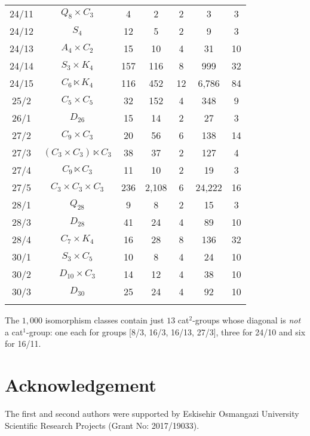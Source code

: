 \documentclass{ws-ijac}
\begin{document}
\begin{table}[h!]
{\begin{tabular}{@{}ccccccc@{}}
	24/11 & $Q_8 \times C_3$ & 4 & 2 & 2 & 3 & 3 \\ 
	24/12 & $S_4$ & 12 & 5 & 2 & 9 & 3 \\ 
	24/13 & $A_4 \times C_2$ & 15 & 10 & 4 & 31 & 10 \\ 
	24/14 & $S_3 \times K_4$ & 157 & 116 & 8 & 999 & 32 \\ 
	24/15 & $C_6 \ltimes K_4$ & 116 & 452 & 12 & 6,786 & 84 \\ 
	25/2 & $C_5 \times C_5$ & 32 & 152 & 4 & 348 & 9 \\ 
	26/1 & $D_{26}$ & 15 & 14 & 2 & 27 & 3 \\ 
	27/2 & $C_9 \times C_3$ & 20 & 56 & 6 & 138 & 14 \\ 
	27/3 & $(C_3 \times C_3) \ltimes C_3$ & 38 & 37 & 2 & 127 & 4 \\ 
	27/4 & $C_9 \ltimes C_3$ & 11 & 10 & 2 & 19 & 3 \\ 
	27/5 & $C_3 \times C_3 \times C_3$ & 236 & 2,108 & 6 & 24,222  & 16 \\ 
	28/1 & $Q_{28}$ & 9 & 8 & 2 & 15 & 3 \\ 
	28/3 & $D_{28}$ & 41 & 24 & 4 & 89 & 10 \\ 
	28/4 & $C_7 \times K_4$ & 16 & 28 & 8 & 136 & 32 \\ 
	30/1 & $S_3 \times C_5$ & 10 & 8 & 4 & 24 & 10 \\ 
	30/2 & $D_{10} \times C_3$ & 14 & 12 & 4 & 38 & 10 \\ 
	30/3 & $D_{30}$ & 25 & 24 & 4 & 92 & 10 \\ 
\botrule
\end{tabular}}
\end{table}

The $1,000$ isomorphism classes contain just $13$ cat$^2$-groups 
whose diagonal is \emph{not} a cat$^1$-group: 
one each for groups [8/3, 16/3, 16/13, 27/3], 
three for 24/10 and six for 16/11. 

\section*{Acknowledgement}

The first and second authors were supported by Eskisehir Osmangazi
University Scientific Research Projects (Grant No: 2017/19033).
\end{document}
